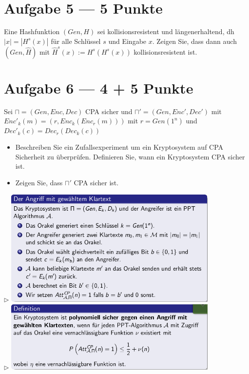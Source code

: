 \documentclass{../crypto_2}
\begin{document}
\section*{Aufgabe 5 --- 5 Punkte}
Eine Hashfunktion $(Gen,H)$ sei kollisionsresistent und längenerhaltend, dh $|x| = |H^s (x)|$ für alle Schlüssel $s$ und Eingabe $x$. Zeigen Sie, dass dann auch $(Gen,\hat{H})$ mit $\hat{H}^s (x):=H^s(H^s(x))$ kollisionsresistent ist. 
\section*{Aufgabe 6 --- 4 + 5 Punkte}
Sei $\sqcap = (Gen, Enc, Dec)$ CPA sicher und $\sqcap' = (Gen, Enc', Dec')$ mit $Enc'_k(m) = (r,Enc_k(Enc_r(m)))$ mit $r=Gen(1^n)$ und $Dec'_k(c)= Dec_r(Dec_k(c))$ 
\begin{itemize}
\item Beschreiben Sie ein Zufallsexperiment um ein Kryptosystem auf CPA Sicherheit zu 	   überprüfen. Definieren Sie, wann ein Kryptosystem CPA sicher ist.
\item Zeigen Sie, dass $\sqcap'$ CPA sicher ist.
\end{itemize}
$\triangleright$ \includegraphics[width = 0.8\textwidth]{CPA1}
\\
$\triangleright $ \includegraphics[width = 0.8\textwidth]{CPA2}
\end{document}
